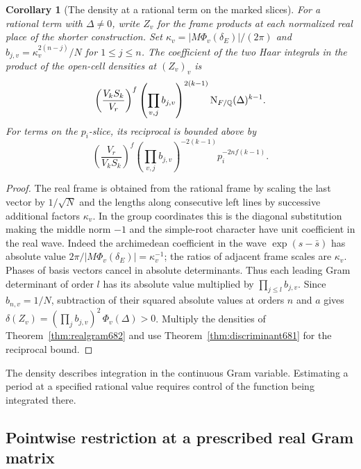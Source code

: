 \documentclass[a4paper,11pt]{article}
\newtheorem{corollary}[proposition]{Corollary}
\theoremstyle{definition}
\theoremstyle{remark}
\numberwithin{equation}{section}
\begin{document}
\begin{corollary}[The density at a rational term on the marked slices]
\leavevmode\label{cor:realmarked682}
For a rational term with \(\Delta\ne0\), write \(Z_v\) for the
frame products at each normalized real place of the shorter
construction. Set \(\kappa_v=|M\Phi_v(\delta_E)|/(2\pi)\) and
\(b_{j,v}=\kappa_v^{2(n-j)}/N\) for \(1\le j\le n\).
The coefficient of the two Haar integrals in the product of the
open-cell densities at \((Z_v)_v\) is
\[
 \left(\frac{V_kS_k}{V_r}\right)^f
 \left(\prod_{v,j} b_{j,v}\right)^{2(k-1)}
             {\rm N}_{F/\mathbb Q}(\Delta)^{k-1}.
\]
For terms on the \(p_i\)-slice, its reciprocal is bounded above
by
\[
 \left(\frac{V_r}{V_kS_k}\right)^f
 \left(\prod_{v,j} b_{j,v}\right)^{-2(k-1)}
                 p_i^{-2nf(k-1)} .
\]
\end{corollary}
\begin{proof}
The real frame is obtained from the rational frame by scaling
the last vector by \(1/\sqrt N\) and the lengths along consecutive
left lines by successive additional factors \(\kappa_v\).
In the group coordinates this is the diagonal substitution
making the middle norm \(-1\) and the simple-root character
have unit coefficient in the real wave. Indeed the archimedean
coefficient in the wave \(\exp(s-\bar s)\) has absolute value
\(2\pi/|M\Phi_v(\delta_E)|=\kappa_v^{-1}\); the ratios of adjacent
frame scales are \(\kappa_v\). Phases of basis vectors cancel in
absolute determinants. Thus each leading Gram determinant of
order \(l\) has its absolute value multiplied by
\(\prod_{j\le l} b_{j,v}\). Since \(b_{n,v}=1/N\), subtraction
of their squared absolute values at orders \(n\) and \(a\)
gives \(\delta(Z_v)=(\prod_j b_{j,v})^2\,\Phi_v(\Delta)>0\).
Multiply the densities of Theorem~\ref{thm:realgram682} and
use Theorem~\ref{thm:discriminant681} for the reciprocal bound.
\end{proof}

The density describes integration in the continuous Gram
variable. Estimating a period at a specified rational value
requires control of the function being integrated there.


\subsection{Pointwise restriction at a prescribed real Gram matrix}
\label{sec:gramtrace683}
\end{document}
